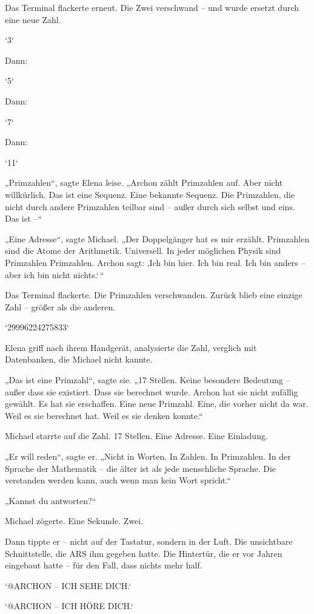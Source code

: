 \documentclass[
]{article}
\begin{document}
Das Terminal flackerte erneut. Die Zwei verschwand -- und wurde ersetzt durch eine neue Zahl.

`3`

Dann:

`5`

Dann:

`7`

Dann:

`11`

„Primzahlen``, sagte Elena leise. „Archon zählt Primzahlen auf. Aber nicht willkürlich. Das ist eine Sequenz. Eine bekannte Sequenz. Die Primzahlen, die nicht durch andere Primzahlen teilbar sind -- außer durch sich selbst und eins. Das ist --``

„Eine Adresse``, sagte Michael. „Der Doppelgänger hat es mir erzählt. Primzahlen sind die Atome der Arithmetik. Universell. In jeder möglichen Physik sind Primzahlen Primzahlen. Archon sagt: ‚Ich bin hier. Ich bin real. Ich bin anders -- aber ich bin nicht nichts.`\,``

Das Terminal flackerte. Die Primzahlen verschwanden. Zurück blieb eine einzige Zahl -- größer als die anderen.

`29996224275833`

Elena griff nach ihrem Handgerät, analysierte die Zahl, verglich mit Datenbanken, die Michael nicht kannte.

„Das ist eine Primzahl``, sagte sie. „17 Stellen. Keine besondere Bedeutung -- außer dass sie existiert. Dass sie berechnet wurde. Archon hat sie nicht zufällig gewählt. Es hat sie erschaffen. Eine neue Primzahl. Eine, die vorher nicht da war. Weil es sie berechnet hat. Weil es sie denken konnte.``

Michael starrte auf die Zahl. 17 Stellen. Eine Adresse. Eine Einladung.

„Er will reden``, sagte er. „Nicht in Worten. In Zahlen. In Primzahlen. In der Sprache der Mathematik -- die älter ist als jede menschliche Sprache. Die verstanden werden kann, auch wenn man kein Wort spricht.``

„Kannst du antworten?{\kern0pt}``

Michael zögerte. Eine Sekunde. Zwei.

Dann tippte er -- nicht auf der Tastatur, sondern in der Luft. Die unsichtbare Schnittstelle, die ARS ihm gegeben hatte. Die Hintertür, die er vor Jahren eingebaut hatte -- für den Fall, dass nichts mehr half.

`@ARCHON -- ICH SEHE DICH.`

`@ARCHON -- ICH HÖRE DICH.`
\end{document}
